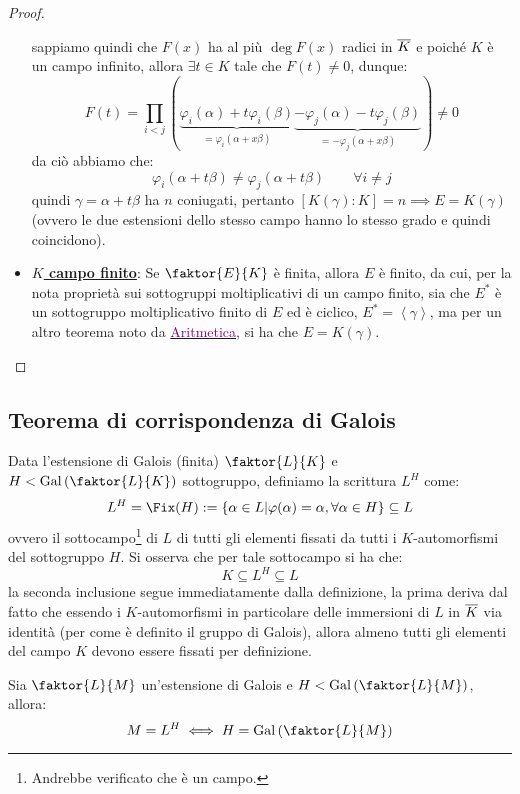 \documentclass[11pt]{scrartcl}
\begin{document}
\begin{proof}
\begin{itemize}
        sappiamo quindi che $F(x)$ ha al più $\deg F(x)$ radici in $\overline K$ e poiché $K$ è un campo infinito, allora $\exists t \in K$ tale che $F(t) \ne 0$, dunque:
        \[ F(t) = \prod_{i<j} (\underbrace{\varphi_i(\alpha)+t\varphi_i(\beta)}_{ = \varphi_i(\alpha+x\beta)}\underbrace{-\varphi_j(\alpha)-t\varphi_j(\beta)}_{ = -\varphi_j(\alpha+x\beta)}) \ne 0
            \]
        da ciò abbiamo che:
        \[ \varphi_i(\alpha+t\beta) \ne \varphi_j(\alpha+t\beta) \qquad \forall i \ne j
            \]
        quindi $\gamma = \alpha+t\beta$ ha $n$ coniugati, pertanto $[K(\gamma) : K] = n \implies E = K(\gamma)$ (ovvero le due estensioni dello stesso campo hanno lo stesso grado e quindi coincidono).
        \item \underline{\textbf{$K$ campo finito}}: Se $\faktor{E}{K}$ è finita, allora $E$ è finito, da cui, per la nota proprietà sui sottogruppi moltiplicativi di un campo finito, sia che $E^*$ è un 
        sottogruppo moltiplicativo finito di $E$ ed è ciclico, $E^* = \left<\gamma\right>$, ma per un altro teorema noto da \href{https://github.com/diego-unipi/Appunti-Aritmetica}{\textcolor{purple}{Aritmetica}}, si ha che $E = K(\gamma)$.
        \end{itemize}
\end{proof}

\newpage
\subsection{Teorema di corrispondenza di Galois}
Data l'estensione di Galois (finita) $\faktor{L}{K}$ e $H < \Gal\left(\faktor{L}{K}\right)$ sottogruppo, definiamo la scrittura $L^H$ come:
\[ L^H = \Fix(H) := \{ \alpha \in L | \varphi(\alpha) = \alpha, \forall \alpha \in H \} \subseteq L
    \]
ovvero il sottocampo\footnote{Andrebbe verificato che è un campo.} di $L$ di tutti gli elementi fissati da tutti i $K$-automorfismi del sottogruppo $H$. Si osserva che per tale sottocampo si ha che:
\[ K \subseteq L^H \subseteq L
    \]
la seconda inclusione segue immediatamente dalla definizione, la prima deriva dal fatto che essendo i $K$-automorfismi in particolare delle immersioni di $L$ in $\overline K$ via identità (per come è definito il gruppo di Galois), allora almeno tutti gli elementi del campo $K$ devono essere fissati 
per definizione.

\begin{lemma}
    \label{3.67}
    Sia $\faktor{L}{M}$ un'estensione di Galois e $H < \Gal\left(\faktor{L}{M}\right)$, allora:
    \[ M = L^H \iff H = \Gal\left(\faktor{L}{M}\right)
        \]
\end{lemma}
\end{document}
